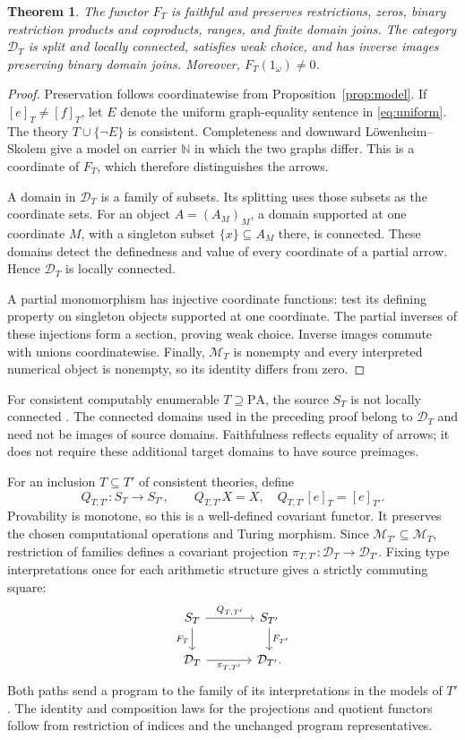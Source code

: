 \documentclass[11pt]{article}
\newtheorem{theorem}{Theorem}[section]
\newcommand{\N}{\mathbb N}
\newcommand{\PA}{\mathrm{PA}}
\begin{document}
\begin{theorem}\label{thm:faithful}
The functor $F_T$ is faithful and preserves restrictions, zeros, binary
restriction products and coproducts, ranges, and finite domain joins. The category
$\mathcal D_T$ is split and locally connected, satisfies weak choice,
and has inverse images preserving binary domain joins. Moreover,
$F_T(1_\omega)\ne0$.
\end{theorem}
\begin{proof}
Preservation follows coordinatewise from Proposition~\ref{prop:model}.
If $[e]_T\ne[f]_T$, let $E$ denote the uniform graph-equality sentence
in \eqref{eq:uniform}. The theory $T\cup\{\neg E\}$ is consistent.
Completeness and downward L\"owenheim--Skolem give a model on carrier
$\N$ in which the two graphs differ. This is a coordinate of $F_T$,
which therefore distinguishes the arrows.

A domain in $\mathcal D_T$ is a family of subsets. Its splitting uses
those subsets as the coordinate sets. For an object $A=(A_M)_M$, a
domain supported at one coordinate $M$, with a singleton subset
$\{x\}\subseteq A_M$ there, is connected. These domains detect the
definedness and value of every coordinate of a partial arrow. Hence
$\mathcal D_T$ is locally connected.

A partial monomorphism has injective coordinate functions: test its
defining property on singleton objects supported at one coordinate.
The partial inverses of these injections form a section, proving weak
choice. Inverse images commute with unions coordinatewise. Finally,
$\mathcal M_T$ is nonempty and every interpreted numerical object is
nonempty, so its identity differs from zero.
\end{proof}

For consistent computably enumerable $T\supseteq\PA$, the source $S_T$
is not locally connected \cite[Corollary 4.4, pp.~657--658]{DPM}.
The connected domains used in the preceding proof belong to
$\mathcal D_T$ and need not be images of source domains. Faithfulness
reflects equality of arrows; it does not require these additional target
domains to have source preimages.

For an inclusion $T\subseteq T'$ of consistent theories, define
\[
 Q_{T,T'}:S_T\to S_{T'},\qquad
 Q_{T,T'}X=X,\quad Q_{T,T'}[e]_T=[e]_{T'}.
\]
Provability is monotone, so this is a well-defined covariant functor.
It preserves the chosen computational operations and Turing morphism.
Since $\mathcal M_{T'}\subseteq\mathcal M_T$, restriction of families
defines a covariant projection
$\pi_{T,T'}:\mathcal D_T\to\mathcal D_{T'}$. Fixing type interpretations
once for each arithmetic structure gives a strictly commuting square:
\[
\begin{tikzcd}[column sep=large]
 S_T \arrow[r,"Q_{T,T'}"] \arrow[d,"F_T"'] &
 S_{T'} \arrow[d,"F_{T'}"]\\
 \mathcal D_T \arrow[r,"\pi_{T,T'}"'] & \mathcal D_{T'}.
\end{tikzcd}
\]
Both paths send a program to the family of its interpretations in the
models of $T'$. The identity and composition laws for the projections
and quotient functors follow from restriction of indices and the
unchanged program representatives.
\end{document}
